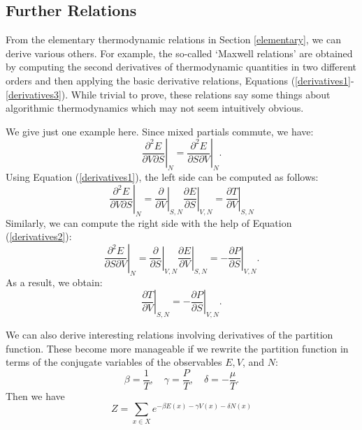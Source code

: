 \documentclass{article}
\begin{document}
\subsection{Further Relations} \label{maxwell}

From the elementary thermodynamic relations in Section 
\ref{elementary}, we can derive various others.  
For example, the so-called `Maxwell relations' are obtained
by computing the second derivatives of thermodynamic quantities in two
different orders and then applying the basic derivative relations,
Equations (\ref{derivatives1}-\ref{derivatives3}).  While 
trivial to prove, these relations say some things about algorithmic 
thermodynamics which may not seem intuitively obvious.

We give just one example here.  Since mixed partials commute, we have:
\[  \left.\frac{\partial^2 E}{\partial V \partial S}\right|_N = 
\left.\frac{\partial^2 E}{\partial S \partial V}\right|_N . \]
Using Equation (\ref{derivatives1}), the left side can be computed
as follows:
\[  \left.\frac{\partial^2 E}{\partial V \partial S}\right|_N = 
\left.\frac{\partial}{\partial V}\right|_{S,N}
\left.\frac{\partial E}{\partial S}\right|_{V,N} = 
\left.\frac{\partial T}{\partial V}\right|_{S,N}  \]
Similarly, we can compute the right side
with the help of Equation (\ref{derivatives2}):
\[  \left.\frac{\partial^2 E}{\partial S \partial V}\right|_N = 
\left.\frac{\partial}{\partial S}\right|_{V,N}
\left.\frac{\partial E}{\partial V}\right|_{S,N} = 
-\left.\frac{\partial P}{\partial S}\right|_{V,N} . \]
As a result, we obtain:
\[  \left.\frac{\partial T}{\partial V}\right|_{S,N}  =
-\left.\frac{\partial P}{\partial S}\right|_{V,N} . \]

We can also derive interesting relations involving derivatives of
the partition function.  These become more manageable if 
we rewrite the partition function in 
terms of the conjugate variables of the observables $E, V$, and $N$:
\begin{equation}
\label{new.variables}
   \beta = \frac{1}{T} , \quad
 \gamma =  \frac{P}{T},  \quad
\delta = -\frac{\mu}{T}.
\end{equation}
Then we have
\[     Z = \sum_{x \in X} e^{-\beta E(x) -\gamma V(x) - \delta N(x)} \]
\end{document}
